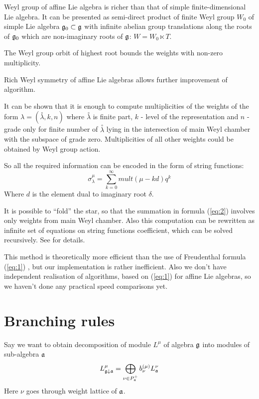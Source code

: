 \documentclass[a4paper,12pt]{article}
\theoremstyle{definition} \newtheorem{Def}{Definition}
\begin{document}
Weyl group of affine Lie algebra is richer than that of simple
finite-dimensional Lie algebra. It can be presented as semi-direct
product of finite Weyl group $W_0$ of simple Lie algebra
$\frak{g}_0\subset \frak{g}$ with infinite abelian group translations
along the roots of $\frak{g}_0$ which are non-imaginary roots of $\frak{g}$: 
$W=W_0\ltimes T$.

The Weyl group orbit of highest root bounds the weights with non-zero
multiplicity.

Rich Weyl symmetry of affine Lie algebras allows further improvement
of algorithm.

It can be shown that it is enough to compute multiplicities of the
weights of the form $\lambda=(\overset{\circ }{\lambda},k,n)$ where
$\overset{\circ }{\lambda}$ is finite part, $k$ - level of the
representation and $n$ - grade only for finite number of
$\overset{\circ}{\lambda}$ lying in the intersection of main Weyl
chamber with the subspace of grade zero.
Multiplicities of all other weights could be obtained by Weyl group
action. 

So all the required information can be encoded in the form of string functions:
\begin{equation}
  \label{eq:3}
  \sigma^{\mu}_{\lambda}=\sum_{k=0}^{\infty} mult(\mu-kd)q^k
\end{equation}
Where $d$ is the element dual to imaginary root $\delta$. 

It is possible to ``fold'' the star, so that the summation in formula
(\ref{eq:2}) involves only weights from main Weyl chamber. Also this
computation can be rewritten as infinite set of equations on string
functions coefficient, which can be solved recursively. See
\cite{kulish4sfa} for details.

This method is theoretically more efficient than the use of Freudenthal
formula (\ref{eq:1}) \cite{Nazarov2008}, but our implementation is
rather inefficient. Also we don't have independent realisation of algorithms,
based on (\ref{eq:1}) for affine Lie algebras, so we haven't done any
practical speed comparisons yet.
\section{Branching rules}
\label{sec:branching-rules}

Say we want to obtain decomposition of module $L^{\mu}$ of algebra
$\frak{g}$ into modules of sub-algebra $\frak{a}$
\begin{equation}
  \label{eq:4}
  L_{\frak{g}\downarrow \frak{a}}^{\mu }=\bigoplus\limits_{\nu \in P_{\frak{a}%
    }^{+}}b_{\nu }^{\left( \mu \right) }L_{\frak{a}}^{\nu }
\end{equation}
Here $\nu$ goes through weight lattice of $\frak{a}$. 
\end{document}

